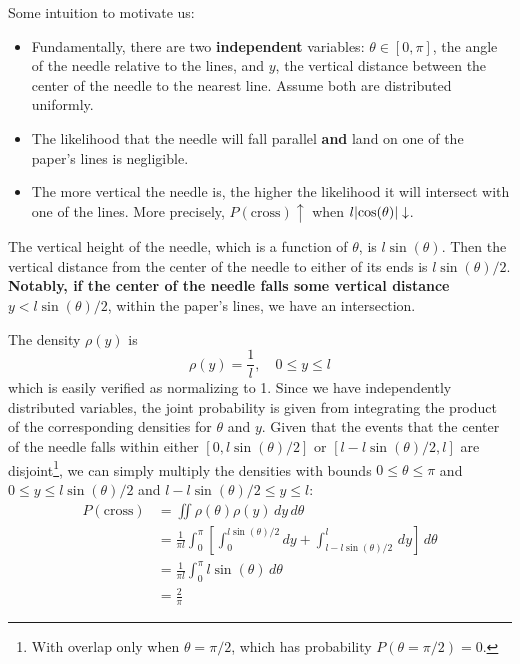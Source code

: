 \documentclass[a4paper]{article}
\begin{document}

Some intuition to motivate us:
\begin{itemize}[label=\(\circ\)]
	\item Fundamentally, there are two \textbf{independent} variables: \( \theta \in \!\left[ 0,\pi \right] \), the angle of the needle relative to the lines, and \( y \), the vertical distance between the center of the needle to the nearest line. Assume both are distributed uniformly.
	\item The likelihood that the needle will fall parallel \textbf{and} land on one of the paper's lines is negligible.
	\item The more vertical the needle is, the higher the likelihood it will intersect with one of the lines. More precisely, \( P \!\left( \text{cross} \right) \uparrow \) when \( l \abs{\cos\!\left(\theta\right)} \downarrow \).
\end{itemize}
The vertical height of the needle, which is a function of \( \theta \), is \( l \sin\!\left(\theta\right) \). Then the vertical distance from the center of the needle to either of its ends is \( l \sin\!\left(\theta\right) / 2 \). \textbf{Notably, if the center of the needle falls some vertical distance \( y < l \sin\!\left(\theta\right) / 2 \)}, within the paper's lines, we have an intersection. 

The density \( \rho \!\left( y \right) \) is
\[
	\rho \!\left( y \right) = \frac{1}{l}, \quad 0 \le y \le l
\]
which is easily verified as normalizing to 1. 
Since we have independently distributed variables, the joint probability is given from integrating the product of the corresponding densities for \( \theta \) and \( y \). Given that the events that the center of the needle falls within either \( \!\left[ 0,l \sin\!\left(\theta\right) / 2 \right] \) or \( \!\left[ l - l \sin\!\left(\theta\right) / 2,l \right] \) are disjoint\footnote{With overlap only when \( \theta = \pi / 2 \), which has probability \( P \!\left( \theta = \pi / 2 \right) = 0 \).}, we can simply multiply the densities with bounds \( 0 \le \theta \le \pi \) and \( 0 \le y \le l \sin\!\left(\theta\right) / 2 \) and \( l - l \sin\!\left(\theta\right) / 2 \le y \le l \):
\begin{align*}
	P \!\left( \text{cross} \right) & = \iint \rho \!\left( \theta \right)\rho \!\left( y \right) \, dy \, d \theta \\
					& = \frac{1}{\pi l}\int^{\pi}_{0} \!\left[ \int^{l \sin\!\left(\theta\right) / 2}_{0} dy + \int^{l}_{l - l \sin\!\left(\theta\right) / 2} \, dy \right] \, d \theta \\
										    & = \frac{1}{\pi l}\int^{\pi}_{0} l \sin\!\left(\theta\right) \, d \theta \\
										    & = \frac{2}{\pi}
\end{align*}
\end{document}
